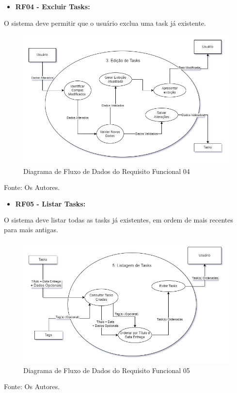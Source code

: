 \documentclass[a4paper,12pt]{article}
\begin{document}
\pagebreak
\begin{itemize}
\item\textbf{RF04 - Excluir Tasks:}
\end{itemize}

O sistema deve permitir que o usuário exclua uma task já existente.
\begin{figure}[H]
	\centering
	\includegraphics[scale=0.45]{DFDs/RF03.drawio.png}
	\caption{Diagrama de Fluxo de Dados do Requisito Funcional 04}
\end{figure}
\noindent Fonte: Os Autores.

\pagebreak
\begin{itemize}
\item\textbf{RF05 - Listar Tasks:}
\end{itemize}

O sistema deve listar todas as tasks já existentes, em ordem de mais recentes para mais antigas.
\begin{figure}[H]
	\centering
	\includegraphics[scale=0.45]{DFDs/RF05.drawio.png}
	\caption{Diagrama de Fluxo de Dados do Requisito Funcional 05}
\end{figure}
\noindent Fonte: Os Autores.
\end{document}
